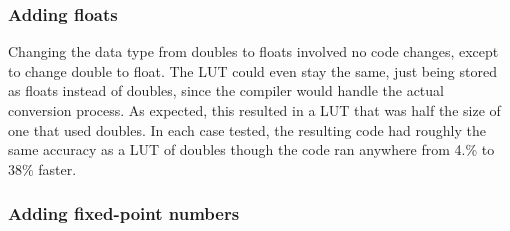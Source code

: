 \subsubsection*{Adding floats}

Changing the data type from doubles to floats involved no code changes, except to change {\ttfamily double} to {\ttfamily float}. The L\+UT could even stay the same, just being stored as floats instead of doubles, since the compiler would handle the actual conversion process. As expected, this resulted in a L\+UT that was half the size of one that used doubles. In each case tested, the resulting code had roughly the same accuracy as a L\+UT of doubles though the code ran anywhere from 4.\% to 38\% faster.

\subsubsection*{Adding fixed-\/point numbers}

